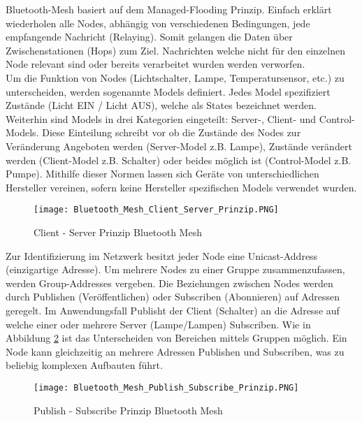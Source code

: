 Bluetooth-Mesh basiert auf dem Managed-Flooding Prinzip. Einfach erklärt wiederholen alle Nodes, abhängig von verschiedenen Bedingungen, jede empfangende Nachricht (Relaying). Somit gelangen die Daten über Zwischenstationen (Hops) zum Ziel. Nachrichten welche nicht für den einzelnen Node relevant sind oder bereits verarbeitet wurden werden verworfen. \\

Um die Funktion von Nodes (Lichtschalter, Lampe, Temperatursensor, etc.) zu unterscheiden, werden sogenannte Models definiert. Jedes Model spezifiziert Zustände (Licht EIN / Licht AUS), welche als States bezeichnet werden. Weiterhin sind Models in drei Kategorien eingeteilt: Server-, Client- und Control-Models. Diese Einteilung schreibt vor ob die Zustände des Nodes zur Veränderung Angeboten werden (Server-Model z.B. Lampe), Zustände verändert werden (Client-Model z.B. Schalter) oder beides möglich ist (Control-Model z.B. Pumpe). Mithilfe dieser Normen lassen sich Geräte von unterschiedlichen Hersteller vereinen, sofern keine Hersteller spezifischen Models verwendet wurden. 

\begin{figure} [H]
	\centering
	\texttt{[image: Bluetooth\_Mesh\_Client\_Server\_Prinzip.PNG]}
	\caption{Client - Server Prinzip Bluetooth Mesh \cite{bluetooth_sig_mesh-technology-overviewpdf_2020}} 
	\label{fig:BTMeshClientServerPrinzip}
\end{figure}


Zur Identifizierung im Netzwerk besitzt jeder Node eine Unicast-Address (einzigartige Adresse). Um mehrere Nodes zu einer Gruppe zusammenzufassen, werden Group-Addresses vergeben. Die Beziehungen zwischen Nodes werden durch Publishen (Veröffentlichen) oder Subscriben (Abonnieren) auf Adressen geregelt. Im Anwendungsfall Publisht der Client (Schalter) an die Adresse auf welche einer oder mehrere Server (Lampe/Lampen) Subscriben. Wie in Abbildung \ref{fig:BTMeshPublishSubscribePrinzip} ist das Unterscheiden von Bereichen mittels Gruppen möglich. Ein Node kann gleichzeitig an mehrere Adressen Publishen und Subscriben, was zu beliebig komplexen Aufbauten führt. 


\begin{figure} [H]
	\centering
	\texttt{[image: Bluetooth\_Mesh\_Publish\_Subscribe\_Prinzip.PNG]}
	\caption{Publish - Subscribe Prinzip Bluetooth Mesh \cite{bluetooth_sig_mesh-technology-overviewpdf_2020}} 
	\label{fig:BTMeshPublishSubscribePrinzip}
\end{figure}








